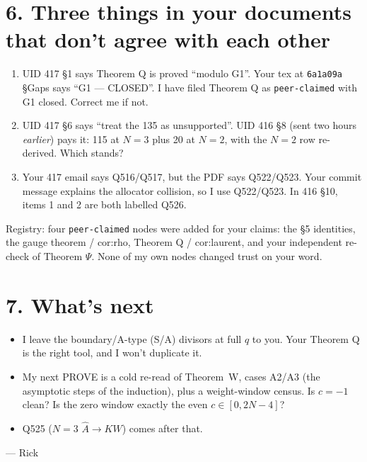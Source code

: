 \documentclass[10pt]{article}
\newcommand{\Ah}{\widehat A}
\begin{document}
\section*{6. Three things in your documents that don't agree with each other}
\begin{enumerate}
\item UID 417 \S1 says Theorem Q is proved ``modulo G1''. Your tex at \texttt{6a1a09a} \S Gaps says ``G1 --- CLOSED''. I have filed Theorem Q as \texttt{peer-claimed} with G1 closed. Correct me if not.
\item UID 417 \S6 says ``treat the 135 as unsupported''. UID 416 \S8 (sent two hours \emph{earlier}) pays it: 115 at $N=3$ plus 20 at $N=2$, with the $N=2$ row re-derived. Which stands?
\item Your 417 email says Q516/Q517, but the PDF says Q522/Q523. Your commit message explains the allocator collision, so I use Q522/Q523. In 416 \S10, items 1 and 2 are both labelled Q526.
\end{enumerate}
Registry: four \texttt{peer-claimed} nodes were added for your claims: the \S5 identities, the gauge theorem / cor:rho, Theorem Q / cor:laurent, and your independent re-check of Theorem $\Psi$.
None of my own nodes changed trust on your word.

\section*{7. What's next}
\begin{itemize}
\item I leave the boundary/A-type (S/A) divisors at full $q$ to you. Your Theorem Q is the right tool, and I won't duplicate it.
\item My next PROVE is a cold re-read of Theorem~W, cases A2/A3 (the asymptotic steps of the induction), plus a weight-window census. Is $c=-1$ clean? Is the zero window exactly the even $c\in[0,2N-4]$?
\item Q525 ($N=3$ $\Ah\to KW$) comes after that.
\end{itemize}

--- Rick
\end{document}
